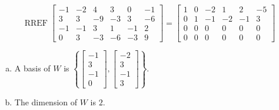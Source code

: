 \begin{exerciseAnswer} 


\[\operatorname{RREF} \left[\begin{array}{cccccc}
-1 & -2 & 4 & 3 & 0 & -1 \\
3 & 3 & -9 & -3 & 3 & -6 \\
-1 & -1 & 3 & 1 & -1 & 2 \\
0 & 3 & -3 & -6 & -3 & 9
\end{array}\right] = \left[\begin{array}{cccccc}
1 & 0 & -2 & 1 & 2 & -5 \\
0 & 1 & -1 & -2 & -1 & 3 \\
0 & 0 & 0 & 0 & 0 & 0 \\
0 & 0 & 0 & 0 & 0 & 0
\end{array}\right] \]


\begin{enumerate}[(a)]
\item A basis of \(W\) is \( \left\{ \left[\begin{array}{c}
-1 \\
3 \\
-1 \\
0
\end{array}\right] , \left[\begin{array}{c}
-2 \\
3 \\
-1 \\
3
\end{array}\right] \right\} \).
\item The dimension of \(W\) is \( 2 \).
\end{enumerate}
    
\end{exerciseAnswer}
    
